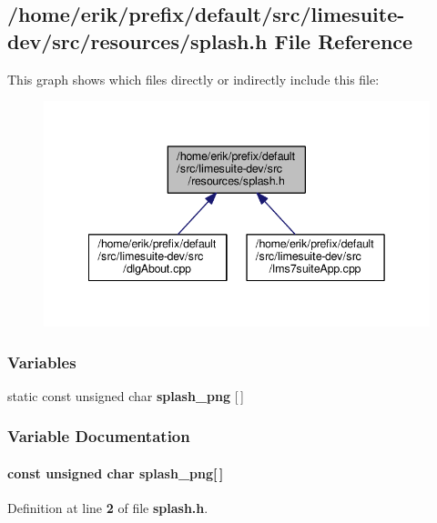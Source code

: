 \subsection{/home/erik/prefix/default/src/limesuite-\/dev/src/resources/splash.h File Reference}
\label{splash_8h}
This graph shows which files directly or indirectly include this file\+:
\nopagebreak
\begin{figure}[H]
\begin{center}
\leavevmode
\includegraphics[width=342pt]{dc/d28/splash_8h__dep__incl}
\end{center}
\end{figure}
\subsubsection*{Variables}
\begin{DoxyCompactItemize}
\item 
static const unsigned char {\bf splash\+\_\+png} [$\,$]
\end{DoxyCompactItemize}


\subsubsection{Variable Documentation}
\paragraph[{splash\+\_\+png}]{\setlength{\rightskip}{0pt plus 5cm}const unsigned char splash\+\_\+png[$\,$]\hspace{0.3cm}{\ttfamily [static]}}\label{splash_8h_afc3b1590a7a4c3e04700b3539689b259}


Definition at line {\bf 2} of file {\bf splash.\+h}.

